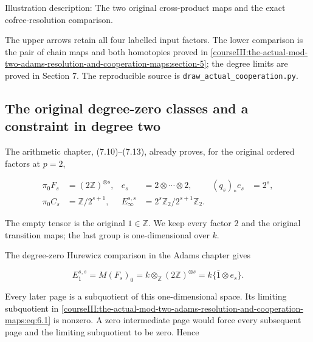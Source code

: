 Illustration description: The two original cross-product maps and the exact cofree-resolution comparison.

The upper arrows retain all four labelled input factors. The lower comparison is the pair of chain maps and both homotopies proved in \cref{courseIII:the-actual-mod-two-adams-resolution-and-cooperation-maps:section-5}; the degree limits are proved in Section 7. The reproducible source is \texttt{draw\_actual\_cooperation.py}.

\subsection{The original degree-zero classes and a constraint in degree two}
\label{courseIII:the-actual-mod-two-adams-resolution-and-cooperation-maps:cooperation-original-diagonal}

\label{courseIII:the-actual-mod-two-adams-resolution-and-cooperation-maps:section-6}\label{courseIII:actual-resolution:6}

The arithmetic chapter, (7.10)--(7.13), already proves, for the original ordered factors at \(p=2\),

\begin{equation}
\begin{aligned}
 \pi_0F_s&=(2\mathbb Z)^{\otimes s},
 &e_s&=2\otimes\cdots\otimes2,
 &(q_s)_*e_s&=2^s,\\
 \pi_0C_s&=\mathbb Z/2^{s+1},
 &E_\infty^{s,s}&=2^s\mathbb Z_2/2^{s+1}\mathbb Z_2.
 \end{aligned}
 \label{courseIII:the-actual-mod-two-adams-resolution-and-cooperation-maps:eq:6.1}
\end{equation}

The empty tensor is the original \(1\in\mathbb Z\). We keep every factor \(2\) and the original transition maps; the last group is one-dimensional over \(k\).

The degree-zero Hurewicz comparison in the Adams chapter gives

\begin{equation}
E_1^{s,s}=M(F_s)_0
      =k\otimes_{\mathbb Z}(2\mathbb Z)^{\otimes s}
      =k\{\bar1\otimes e_s\}.
 \label{courseIII:the-actual-mod-two-adams-resolution-and-cooperation-maps:eq:6.2}
\end{equation}

Every later page is a subquotient of this one-dimensional space. Its limiting subquotient in \eqref{courseIII:the-actual-mod-two-adams-resolution-and-cooperation-maps:eq:6.1} is nonzero. A zero intermediate page would force every subsequent page and the limiting subquotient to be zero. Hence

